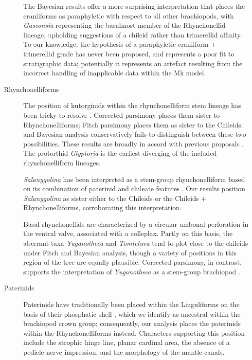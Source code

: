 \documentclass[openany]{book}
\begin{document}
\begin{description}
The Bayesian results offer a more surprising interpretation that places
the craniiforms as paraphyletic with respect to all other brachiopods,
with \emph{Gasconsia} representing the basalmost member of the
Rhynchonellid lineage, upholding suggestions
\citep{Holmer2014OrdovicianSilurian} of a chileid rather than
trimerellid affinity. To our knowledge, the hypothesis of a paraphyletic
craniiform + trimerellid grade has never been proposed, and represents a
poor fit to stratigraphic data; potentially it represents an artefact
resulting from the incorrect handling of inapplicable data within the Mk
model.
\item[Rhynchonelliforms]
The position of kutorginids within the rhynchonelliform stem lineage has
been tricky to resolve \citep{Holmer2018Theattachment}. Corrected
parsimony places them sister to Rhynchonelliforms; Fitch parsimony
places them as sister to the Chileids; and Bayesian analysis
conservatively fails to distinguish between these two possibilities.
These results are broadly in accord with previous proposals
\citep{Holmer2018Evolutionarysignificance}. The protorthid
\emph{Glyptoria} is the earliest diverging of the included
rhynchonelliform lineages.

\emph{Salanygolina} has been interpreted as a stem-group
rhynchonelliform based on its combination of paterinid and chileate
features \citep{Holmer2009Theenigmatic}. Our results position
\emph{Salanygolina} as sister either to the Chileids or the Chileids +
Rhynchonelliforms, corroborating this interpretation.

Basal rhynchonellids are characterized by a circular umbonal perforation
in the ventral valve, associated with a colleplax. Partly on this basis,
the aberrant taxa \emph{Yuganotheca} and \emph{Tomteluva} tend to plot
close to the chileids under Fitch and Bayesian analysis, though a
variety of positions in this region of the tree are equally plausible.
Corrected parsimony, in contrast, supports the interpretation of
\emph{Yuganotheca} as a stem-group brachiopod \citep{Zhang2014Anearly}.
\item[Paterinids]
Paterinids have traditionally been placed within the Linguliforms on the
basis of their phosphatic shell \citep{Williams2007Supplement}, which we
identify as ancestral within the brachiopod crown group; consequently,
our analysis places the paterinids within the Rhynchonelliforms instead.
Characters supporting this position include the strophic hinge line,
planar cardinal area, the absence of a pedicle nerve impression, and the
morphology of the mantle canals.


\end{description}
\end{document}
